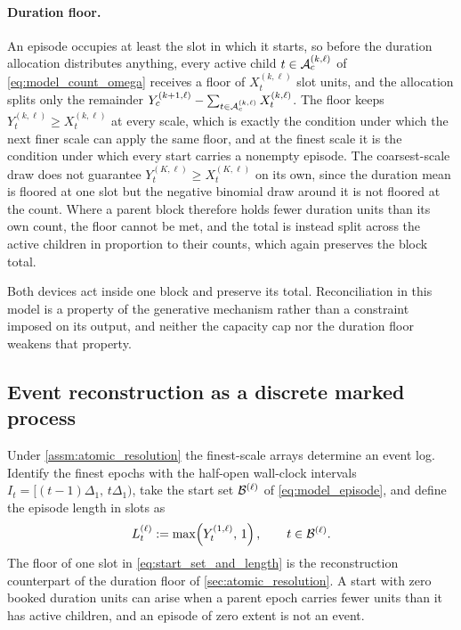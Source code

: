 \paragraph{Duration floor.}
An episode occupies at least the slot in which it starts, so before the
duration allocation distributes anything, every active child
$t \in {\mathcal{A}}_c^{(k,\ell)}$ of \cref{eq:model_count_omega} receives a floor of
$X_t^{(k,\ell)}$ slot units, and the allocation splits only the remainder
$Y_c^{(k+1,\ell)} - \sum_{t \in {\mathcal{A}}_c^{(k,\ell)}} X_t^{(k,\ell)}$.
The floor keeps $Y_t^{(k,\ell)} \ge X_t^{(k,\ell)}$ at every scale, which is
exactly the condition under which the next finer scale can apply the same
floor, and at the finest scale it is the condition under which every start
carries a nonempty episode. The coarsest-scale draw does not guarantee
$Y_t^{(K,\ell)} \ge X_t^{(K,\ell)}$ on its own, since the duration mean is
floored at one slot but the negative binomial draw around it is not floored at
the count. Where a parent block therefore holds fewer duration units than its
own count, the floor cannot be met, and the total is instead split across the
active children in proportion to their counts, which again preserves the block
total.

\begin{remark}
Both devices act inside one block and preserve its total. Reconciliation in
this model is a property of the generative mechanism rather than a constraint
imposed on its output, and neither the capacity cap nor the duration floor
weakens that property.
\end{remark}

\subsection{Event reconstruction as a discrete marked process}
\label{sec:event_reconstruction}

Under \cref{assm:atomic_resolution} the finest-scale arrays determine an event
log. Identify the finest epochs with the half-open wall-clock intervals
$I_t = [(t-1)\Delta_1,\, t\Delta_1)$, take the start set ${\mathcal{B}}^{(\ell)}$ of
\cref{eq:model_episode}, and define the episode length in slots as
\begin{align}
L_t^{(\ell)} := \max\!\left( Y_t^{(1,\ell)}, \, 1 \right),
\qquad t \in {\mathcal{B}}^{(\ell)} .
\label{eq:start_set_and_length}
\end{align}
The floor of one slot in \cref{eq:start_set_and_length} is the reconstruction
counterpart of the duration floor of \cref{sec:atomic_resolution}. A start with
zero booked duration units can arise when a parent epoch carries fewer units
than it has active children, and an episode of zero extent is not an event.

